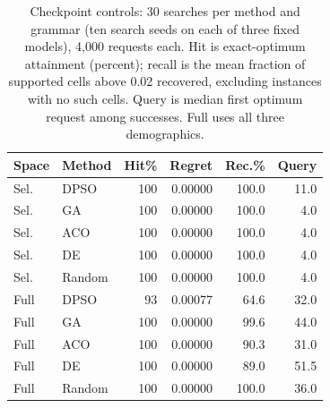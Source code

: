 \begin{table}[t]
\centering
\caption{Checkpoint controls: 30 searches per method and grammar (ten search seeds on each of three fixed models), 4,000 requests each. Hit is exact-optimum attainment (percent); recall is the mean fraction of supported cells above 0.02 recovered, excluding instances with no such cells. Query is median first optimum request among successes. Full uses all three demographics.}
\label{tab:extended-neumf}
\small
\begin{tabular}{llrrrr}
\toprule
Space & Method & Hit\% & Regret & Rec.\% & Query \\
\midrule
Sel. & DPSO & 100 & 0.00000 & 100.0 & 11.0 \\
Sel. & GA & 100 & 0.00000 & 100.0 & 4.0 \\
Sel. & ACO & 100 & 0.00000 & 100.0 & 4.0 \\
Sel. & DE & 100 & 0.00000 & 100.0 & 4.0 \\
Sel. & Random & 100 & 0.00000 & 100.0 & 4.0 \\
Full & DPSO & 93 & 0.00077 & 64.6 & 32.0 \\
Full & GA & 100 & 0.00000 & 99.6 & 44.0 \\
Full & ACO & 100 & 0.00000 & 90.3 & 31.0 \\
Full & DE & 100 & 0.00000 & 89.0 & 51.5 \\
Full & Random & 100 & 0.00000 & 100.0 & 36.0 \\
\bottomrule
\end{tabular}
\end{table}
